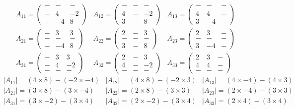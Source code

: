\documentclass{article}
\begin{document}
\[
	\begin{matrix}
				A_{11} = 
				\begin{pmatrix}
					- & - & -\\
					- & 4 & -2\\
					- & -4 & 8
				\end{pmatrix}
			&
				A_{12} = 
				\begin{pmatrix}
					- & - & -\\
					4 & - & -2\\
					3 & - & 8
				\end{pmatrix}
			&
				A_{13} = 
				\begin{pmatrix}
					- & - & -\\
					4 & 4 & -\\
					3 & -4 & -
				\end{pmatrix}
		\\
				A_{21} = 
				\begin{pmatrix}
					- & 3 & 3\\
					- & - & -\\
					- & -4 & 8
				\end{pmatrix}
			&
				A_{22} = 
				\begin{pmatrix}
					2 & - & 3\\
					- & - & -\\
					3 & - & 8
				\end{pmatrix}
			&
				A_{23} = 
				\begin{pmatrix}
					2 & 3 & -\\
					- & - & -\\
					3 & -4 & -
				\end{pmatrix}
		\\
				A_{31} = 
				\begin{pmatrix}
					- & 3 & 3\\
					- & 4 & -2\\
					- & - & -
				\end{pmatrix}
			&
				A_{32} = 
				\begin{pmatrix}
					2 & - & 3\\
					4 & - & -2\\
					- & - & -
				\end{pmatrix}
			&
				A_{33} = 
				\begin{pmatrix}
					2 & 3 & -\\
					4 & 4 & -\\
					- & - & -
				\end{pmatrix}
	\end{matrix}
\]
\[
	\begin{matrix}
		|A_{11}| = (4\times8)-(-2\times-4) & |A_{12}| = (4\times8)-(-2\times3) & |A_{13}| = (4\times-4)-(4\times3)\\
		|A_{21}| = (3\times8)-(3\times-4) & |A_{22}| = (2\times8)-(3\times3) & |A_{23}| = (2\times-4)-(3\times3)\\
		|A_{31}| = (3\times-2)-(3\times4) & |A_{32}| = (2\times-2)-(3\times4) & |A_{33}| = (2\times4)-(3\times4)
	\end{matrix}
\]
\end{document}
